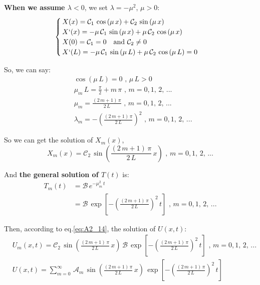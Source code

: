 \documentclass[../main.tex]{subfiles}
\begin{document}
\textbf{When we assume $\lambda < 0$}, we set $\lambda = - \mu^2$, $\mu > 0$:
\begin{align}
    \begin{cases} \label{eq:A2_10}
        \, X(x) = \mathcal{C}_1 \, \cos{(\mu \, x)} + \mathcal{C}_2 \, \sin{(\mu \, x)} \\
        \, X`(x) = - \mu \, \mathcal{C}_1 \, \sin{(\mu \, x)} + \mu \, \mathcal{C}_2 \, \cos{(\mu \, x)} \\
        \, X(0) = \mathcal{C}_1 = 0 \quad \text{and } \mathcal{C}_2 \neq 0 \\
        \, X`(L) = - \mu \, \mathcal{C}_1 \, \sin{(\mu \, L)} + \mu \, \mathcal{C}_2 \, \cos{(\mu \, L)} = 0
    \end{cases}
\end{align}

So, we can say:
\begin{align}
    & \cos{(\mu \, L)} = 0 \text{ ,  } \mu \, L > 0 \\
    & \mu_m \, L = \frac{\pi}{2} + m \, \pi \text{ ,  } m = 0, 1 \text{, } 2 \text{, ...} \nonumber \\
    & \mu_m = \frac{(2 \, m + 1) \, \pi}{2 \, L} \text{ ,  } m = 0, 1 \text{, } 2 \text{, ...} \nonumber \\
    & \lambda_m = - \left(\frac{(2 \, m + 1) \, \pi}{2 \, L}\right)^2 \text{ ,  } m = 0, 1 \text{, } 2 \text{, ...}
\end{align}

So we can get the solution of $X_m(x)$,
\begin{equation} \label{eq:A2_24}
    X_m(x) = \mathcal{C}_2 \, \sin{\left(\frac{(2 \, m + 1) \, \pi}{2 \, L} \, x\right)} \text{ ,  } m = 0, 1 \text{, } 2 \text{, ...}
\end{equation}

And \textbf{the general solution of $T(t)$} is:
\begin{align}
    T_m(t) &= \mathcal{B} \, e^{- \mu_m^2 \, t} \\
           &= \mathcal{B} \, \exp{\left[- \left(\frac{(2 \, m + 1) \, \pi}{2 \, L}\right)^2 \, t \right]} \text{ ,  } m = 0, 1 \text{, } 2 \text{, ...}
\end{align}

Then, according to eq.\ref{eq:A2_14}, the solution of $U(x,t)$:
\begin{align}
    & U_m(x,t) = \mathcal{C}_2 \, \sin{\left(\frac{(2 \, m + 1) \, \pi}{2 \, L} \, x\right)} \, \mathcal{B} \, \exp{\left[- \left(\frac{(2 \, m + 1) \, \pi}{2 \, L}\right)^2 \, t \right]} \text{ ,  } m = 0, 1 \text{, } 2 \text{, ...} \\
    & U(x,t) = \sum_{m=0}^{\infty} \, \mathcal{A}_m \,  \sin{\left(\frac{(2 \, m + 1) \, \pi}{2 \, L} \, x\right)} \, \exp{\left[- \left(\frac{(2 \, m + 1) \, \pi}{2 \, L}\right)^2 \, t \right]}
\end{align}
\end{document}
